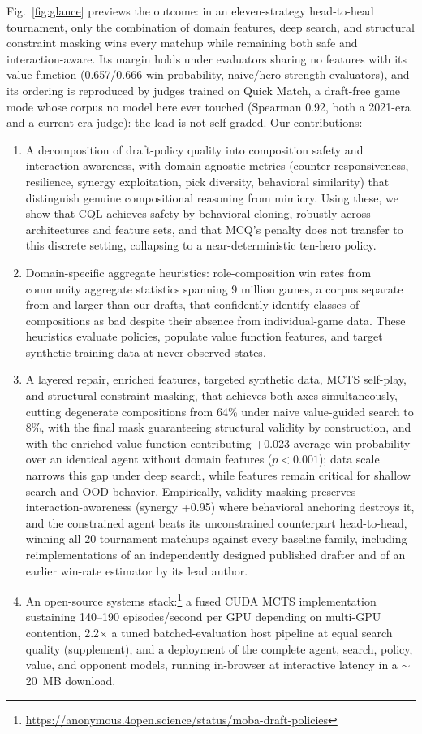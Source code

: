 \documentclass[journal]{IEEEtran}
\newcommand{\repourl}{\url{https://anonymous.4open.science/status/moba-draft-policies}}
\begin{document}
Fig.~\ref{fig:glance} previews the outcome: in an eleven-strategy head-to-head tournament, only the combination of domain features, deep search, and structural constraint masking wins every matchup while remaining both safe and interaction-aware. Its margin holds under evaluators sharing no features with its value function (0.657/0.666 win probability, naive/hero-strength evaluators), and its ordering is reproduced by judges trained on Quick Match, a draft-free game mode whose corpus no model here ever touched (Spearman 0.92, both a 2021-era and a current-era judge): the lead is not self-graded. Our contributions:
\begin{enumerate}
    \item A decomposition of draft-policy quality into composition safety and interaction-awareness, with domain-agnostic metrics (counter responsiveness, resilience, synergy exploitation, pick diversity, behavioral similarity) that distinguish genuine compositional reasoning from mimicry. Using these, we show that CQL achieves safety by behavioral cloning, robustly across architectures and feature sets, and that MCQ's penalty does not transfer to this discrete setting, collapsing to a near-deterministic ten-hero policy.
    \item Domain-specific aggregate heuristics: role-composition win rates from community aggregate statistics spanning 9 million games, a corpus separate from and larger than our drafts, that confidently identify classes of compositions as bad despite their absence from individual-game data. These heuristics evaluate policies, populate value function features, and target synthetic training data at never-observed states.
    \item A layered repair, enriched features, targeted synthetic data, MCTS self-play, and structural constraint masking, that achieves both axes simultaneously, cutting degenerate compositions from 64\% under naive value-guided search to 8\%, with the final mask guaranteeing structural validity by construction, and with the enriched value function contributing +0.023 average win probability over an identical agent without domain features ($p < 0.001$); data scale narrows this gap under deep search, while features remain critical for shallow search and OOD behavior. Empirically, validity masking preserves interaction-awareness (synergy +0.95) where behavioral anchoring destroys it, and the constrained agent beats its unconstrained counterpart head-to-head, winning all 20 tournament matchups against every baseline family, including reimplementations of an independently designed published drafter and of an earlier win-rate estimator by its lead author.    \item An open-source systems stack:\footnote{\repourl} a fused CUDA MCTS implementation sustaining 140--190 episodes/second per GPU depending on multi-GPU contention, 2.2$\times$ a tuned batched-evaluation host pipeline at equal search quality (supplement), and a deployment of the complete agent, search, policy, value, and opponent models, running in-browser at interactive latency in a $\sim$20~MB download.
\end{enumerate}
\end{document}

